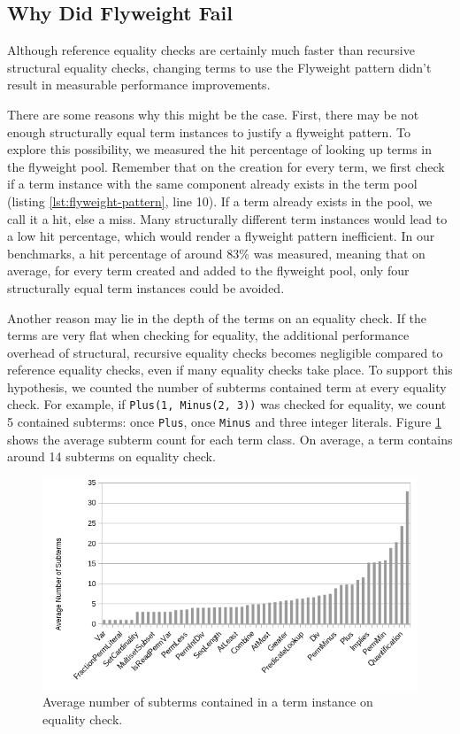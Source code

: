 \documentclass[11pt]{article}
\begin{document}
    \subsection{Why Did Flyweight Fail}

    Although reference equality checks are certainly much faster than recursive structural equality
    checks, changing terms to use the Flyweight pattern didn't result in measurable performance improvements.

    There are some reasons why this might be the case. First, there may be not enough structurally
    equal term instances to justify
    a flyweight pattern. To explore this possibility, we measured the hit percentage
    of looking up terms in the flyweight pool. Remember that on the creation for every
    term, we first check if a term instance with the same component already exists in the
    term pool (listing \ref{lst:flyweight-pattern}, line 10).
    If a term already exists in the pool, we call it a hit, else a miss.
    Many structurally different term instances would lead to
    a low hit percentage, which would render a flyweight pattern inefficient. In our
    benchmarks, a hit percentage of around 83\% was measured, meaning that on average,
    for every term created and added to the flyweight pool,
    only four structurally equal term instances could be avoided.

    Another reason may lie in the depth of the terms on an equality check. If
    the terms are very flat when checking for equality, the additional performance overhead of structural, recursive equality checks becomes negligible compared to reference equality checks, even
    if many equality checks take place. To support this hypothesis, we counted the number of subterms
    contained term at every equality check. For example, if \texttt{Plus(1, Minus(2, 3))} was checked for equality,
    we count 5 contained subterms: once \texttt{Plus}, once \texttt{Minus} and three integer literals.
    Figure \ref{fig:node-count} shows the average subterm count for each term class. On average,
    a term contains around 14 subterms on equality check.

    \begin{figure}[H]
        \includegraphics[width=\linewidth]{node-count.png}
        \caption{Average number of subterms contained in a term instance on equality check.}
        \label{fig:node-count}
    \end{figure}
\end{document}
